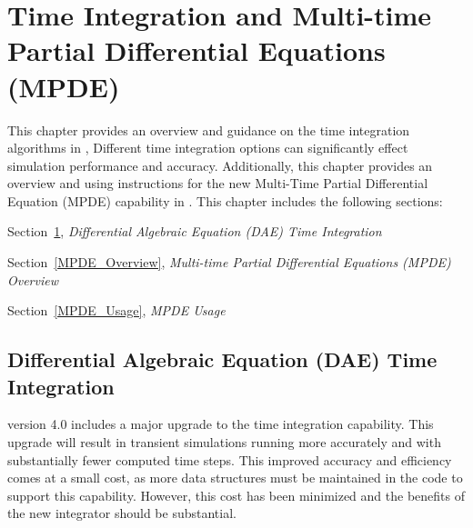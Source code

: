 


\chapter{Time Integration and Multi-time Partial Differential Equations (MPDE)}
\label{TimeInt}

{
This chapter provides an overview and guidance on the time integration algorithms in \Xyce{},
Different time integration options can significantly effect simulation performance and accuracy.  
Additionally, this chapter provides an  overview and using instructions for the 
new Multi-Time Partial Differential Equation (MPDE) capability in \Xyce{}.
This chapter includes the following sections:
\begin{XyceItemize}
  \item Section~\ref{TimeInt}, {\em Differential Algebraic Equation (DAE) Time Integration}
  \item Section~\ref{MPDE_Overview}, {\em Multi-time Partial Differential Equations (MPDE) Overview}
  \item Section~\ref{MPDE_Usage}, {\em MPDE Usage}
\end{XyceItemize}
}

\section{Differential Algebraic Equation (DAE) Time Integration}
\label{TimeInt_Discussion}
\Xyce{} version 4.0 includes a major upgrade to the time integration capability.  
This upgrade will result in transient simulations running more accurately and with 
substantially fewer computed time steps.  This improved accuracy and efficiency comes at
a small cost, as more data structures must be maintained in the code to support this 
capability.  However, this cost has been minimized and the benefits of the new integrator
should be substantial.

